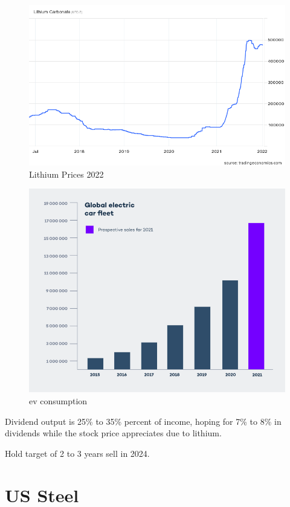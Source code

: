 \begin{figure}
\includegraphics[width=\linewidth]{src/content/images/lithium_prices_2022.png}
\caption{Lithium Prices 2022}
\end{figure}

\begin{figure}
\includegraphics[width=\linewidth]{src/content/images/ev_2021.png}
\caption{ev consumption}
\end{figure}

Dividend output is 25\% to 35\% percent of income, hoping for 7\% to 8\% in dividends while the stock price appreciates due to lithium.

Hold target of 2 to 3 years sell in 2024.

\section{US Steel}
